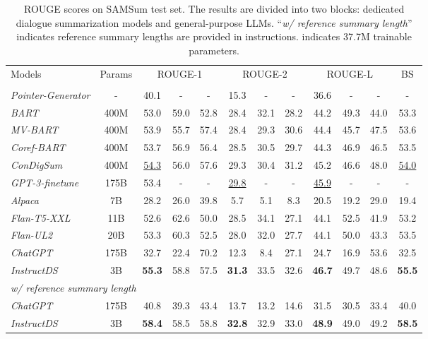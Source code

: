 \documentclass[11pt]{article}
\begin{document}
\begin{table*}[t]
        \centering
        \begin{adjustbox}{width=1.00\textwidth,center}
        \begin{tabular}{| l c | c  c  c | c  c  c | c  c  c | c | }
        \toprule
        
        \multirow{2}{*}{Models} & \multirow{2}{*}{Params} & \multicolumn{3}{c|}{ROUGE-1} & \multicolumn{3}{c|}{ROUGE-2} & \multicolumn{3}{c|}{ROUGE-L} & \multirow{2}{*}{BS} \\
        \cline{3-11}
         & &  &  &  &  &  &  &  &  &  &  \\
        \hline
        \emph{Pointer-Generator} & - & 40.1 & - & - & 15.3 & - & - & 36.6 & - & - & - \\
        \emph{BART} & 400M & 53.0 & 59.0 & 52.8 & 28.4 & 32.1 & 28.2 & 44.2 & 49.3 & 44.0 & 53.3 \\
        \emph{MV-BART} & 400M & 53.9 & 55.7 & 57.4 & 28.4 & 29.3 & 30.6 & 44.4 & 45.7 & 47.5 & 53.6 \\
        \emph{Coref-BART} & 400M & 53.7 & 56.9 & 56.4 & 28.5 & 30.5 & 29.7 & 44.3 & 46.9 & 46.5 & 53.5 \\
        \emph{ConDigSum} & 400M & \underline{54.3} & 56.0 & 57.6 & 29.3 & 30.4 & 31.2 & 45.2 & 46.6 & 48.0 & \underline{54.0} \\
        \emph{GPT-3-finetune} & 175B & 53.4 & - & - & \underline{29.8} & - & - & \underline{45.9} & - & - & -\\
        \hline
        \emph{Alpaca} & 7B & 28.2 & 26.0 & 39.8 & 5.7 & 5.1 & 8.3 & 20.5 & 19.2 & 29.0 & 19.4 \\
        \emph{Flan-T5-XXL} & 11B & 52.6 & 62.6 & 50.0 & 28.5 & 34.1 & 27.1 & 44.1 & 52.5 & 41.9 & 53.2 \\
        \emph{Flan-UL2} & 20B & 53.3 & 60.3 & 52.5 & 28.0 & 32.0 & 27.7 & 44.1 & 50.0 & 43.3 & 53.5 \\
        \emph{ChatGPT} & 175B & 32.7 & 22.4 & 70.2 & 12.3 & 8.4 & 27.1 & 24.7 & 16.9 & 53.6 & 32.5 \\
        \hline
        \emph{InstructDS} & 3B & \textbf{55.3} & 58.8 & 57.5 & \textbf{31.3} & 33.5 & 32.6 & \textbf{46.7} & 49.7 & 48.6 & \textbf{55.5} \\ \hline \hline 
        \multicolumn{12}{|l|}{\emph{w/ reference summary length}}\\\hline
        \emph{ChatGPT} & 175B & 40.8 & 39.3 & 43.4 & 13.7 & 13.2 & 14.6 & 31.5 & 30.5 & 33.4 & 40.0 \\
        \emph{InstructDS} & 3B & \textbf{58.4} & 58.5 & 58.8 & \textbf{32.8} & 32.9 & 33.0 & \textbf{48.9} & 49.0 & 49.2 & \textbf{58.5} \\
        \bottomrule
        \end{tabular}
        \end{adjustbox}
        \caption{ROUGE scores on SAMSum test set. The results are divided into two blocks: dedicated dialogue summarization models and general-purpose LLMs. ``\emph{w/ reference summary length}'' indicates reference summary lengths are provided in instructions.  indicates 37.7M trainable parameters.}
        \label{tab:samsum_results}
    \end{table*}
\end{document}

